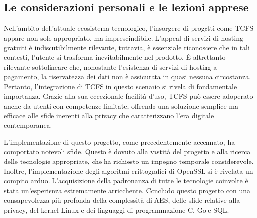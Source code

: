 \subsection{Le considerazioni personali e le lezioni apprese}
Nell’ambito dell’attuale ecosistema tecnologico, l’insorgere di progetti come TCFS appare non solo appropriato, ma imprescindibile. L’appeal di servizi di hosting gratuiti è indiscutibilmente rilevante, tuttavia, è essenziale riconoscere che in tali contesti, l’utente si trasforma inevitabilmente nel prodotto. È altrettanto rilevante sottolineare che, nonostante l’esistenza di servizi di hosting a pagamento, la riservatezza dei dati non è assicurata in quasi nessuna circostanza. Pertanto, l’integrazione di TCFS in questo scenario si rivela di fondamentale importanza. Grazie alla sua eccezionale facilità d’uso, TCFS può essere adoperato anche da utenti con competenze limitate, offrendo una soluzione semplice ma efficace alle sfide inerenti alla privacy che caratterizzano l’era digitale contemporanea.

L’implementazione di questo progetto, come precedentemente accennato, ha comportato notevoli sfide. Questo è dovuto alla vastità del progetto e alla ricerca delle tecnologie appropriate, che ha richiesto un impegno temporale considerevole. Inoltre, l’implementazione degli algoritmi crittografici di OpenSSL si è rivelata un compito arduo. L’acquisizione della padronanza di tutte le tecnologie coinvolte è stata un’esperienza estremamente arricchente. Concludo questo progetto con una consapevolezza più profonda della complessità di AES, delle sfide relative alla privacy, del kernel Linux e dei linguaggi di programmazione C, Go e SQL.
